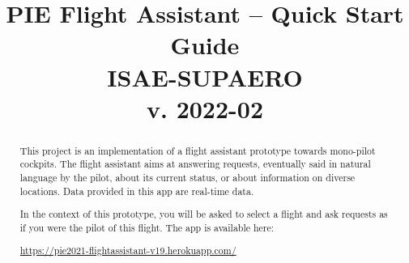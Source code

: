 \documentclass[12pt,oneside,a4]{article}
\title{PIE Flight Assistant -- Quick Start Guide\\ \vspace{.2em} \large{ISAE-SUPAERO} \\ \small{v. 2022-02}\\ \vspace{-4em}}
\author{
    }
\date{}
\newcommand{\linkdeploy}{https://pie2021-flightassistant-v19.herokuapp.com/}
\begin{document}
\maketitle
\vfill
\begin{center}
\end{center}
\vfill

\begin{abstract}
This project is an implementation of a flight assistant prototype towards mono-pilot cockpits.
The flight assistant aims at answering requests, eventually said in natural language by the pilot,
about its current status, or about information on diverse locations.
Data provided in this app are real-time data.

In the context of this prototype, you will be asked to select a flight and ask requests
as if you were the pilot of this flight.
The app is available here:
\begin{center}
    \vspace{-.5em}
    \url{\linkdeploy}
    \vspace{-.5em}
\end{center}
\end{abstract}

\clearpage
\tableofcontents

\clearpage

\end{document}
